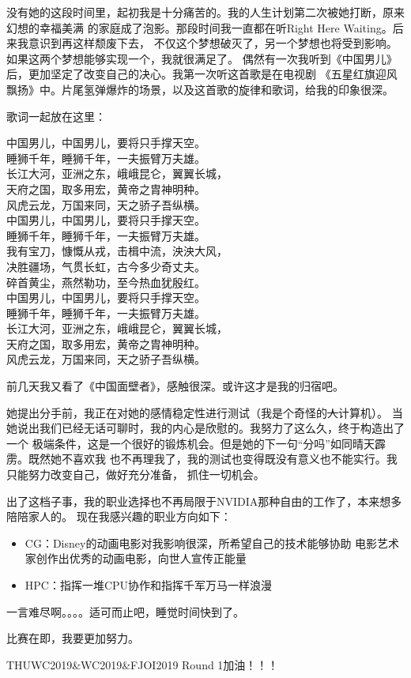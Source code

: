 没有她的这段时间里，起初我是十分痛苦的。我的人生计划第二次被她打断，原来幻想的幸福美满
的家庭成了泡影。那段时间我一直都在听Right Here Waiting。后来我意识到再这样颓废下去，
不仅这个梦想破灭了，另一个梦想也将受到影响。如果这两个梦想能够实现一个，我就很满足了。
偶然有一次我听到《中国男儿》后，更加坚定了改变自己的决心。我第一次听这首歌是在电视剧
《五星红旗迎风飘扬》中。片尾氢弹爆炸的场景，以及这首歌的旋律和歌词，给我的印象很深。

歌词一起放在这里：
\begin{center}
中国男儿，中国男儿，要将只手撑天空。\\
睡狮千年，睡狮千年，一夫振臂万夫雄。\\
长江大河，亚洲之东，峨峨昆仑，翼翼长城，\\
天府之国，取多用宏，黄帝之胄神明种。\\
风虎云龙，万国来同，天之骄子吾纵横。\\
中国男儿，中国男儿，要将只手撑天空。\\
睡狮千年，睡狮千年，一夫振臂万夫雄。\\
我有宝刀，慷慨从戎，击楫中流，泱泱大风，\\
决胜疆场，气贯长虹，古今多少奇丈夫。\\
碎首黄尘，燕然勒功，至今热血犹殷红。\\
中国男儿，中国男儿，要将只手撑天空。\\
睡狮千年，睡狮千年，一夫振臂万夫雄。\\
长江大河，亚洲之东，峨峨昆仑，翼翼长城，\\
天府之国，取多用宏，黄帝之胄神明种。\\
风虎云龙，万国来同，天之骄子吾纵横。\\
\end{center}

前几天我又看了《中国面壁者》，感触很深。或许这才是我的归宿吧。

她提出分手前，我正在对她的感情稳定性进行测试（我是个奇怪的\sout{人}计算机）。
当她说出我们已经无话可聊时，我的内心是欣慰的。我努力了这么久，终于构造出了一个
极端条件，这是一个很好的锻炼机会。但是她的下一句``分吗''如同晴天霹雳。既然她不喜欢我
也不再理我了，我的测试也变得既没有意义也不能实行。我只能努力改变自己，做好充分准备，
抓住一切机会。

出了这档子事，我的职业选择也不再局限于NVIDIA那种自由的工作了，本来想多陪陪家人的。
现在我感兴趣的职业方向如下：
\begin{itemize}
    \item CG：Disney的动画电影对我影响很深，所希望自己的技术能够协助
    电影艺术家创作出优秀的动画电影，向世人宣传正能量
    \item HPC：指挥一堆CPU协作和指挥千军万马一样浪漫
\end{itemize}

一言难尽啊。。。。适可而止吧，睡觉时间快到了。

比赛在即，我要更加努力。

THUWC2019\&WC2019\&FJOI2019 Round 1加油！！！
